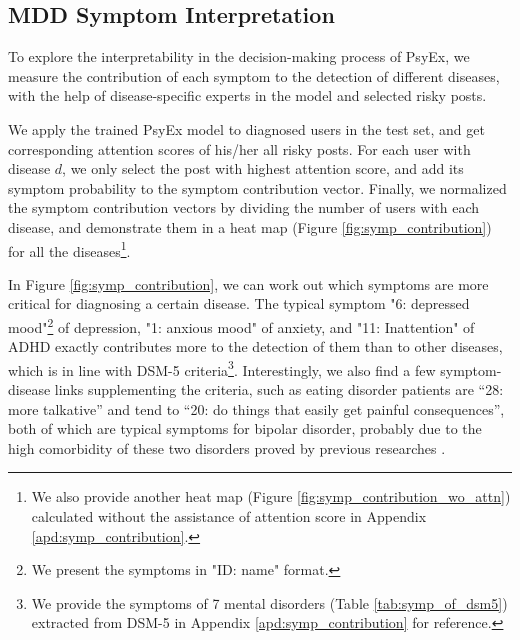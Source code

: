 
\subsection{MDD Symptom Interpretation}
\label{sec:interpret}

To explore the interpretability in the decision-making process of PsyEx, we measure the contribution of each symptom to the detection of different diseases, with the help of disease-specific experts in the model and selected risky posts. 

We apply the trained PsyEx model to diagnosed users in the test set, and get corresponding attention scores of his/her all risky posts.
For each user with disease $d$, we only select the post with highest attention score, and add its symptom probability to the symptom contribution vector. 
Finally, we normalized the symptom contribution vectors by dividing the number of users with each disease, and demonstrate them in a heat map (Figure \ref{fig:symp_contribution}) for all the diseases\footnote{We also provide another heat map (Figure \ref{fig:symp_contribution_wo_attn}) calculated without the assistance of attention score in Appendix \ref{apd:symp_contribution}.}.

In Figure \ref{fig:symp_contribution}, we can work out which symptoms are more critical for diagnosing a certain disease. The typical symptom "6: depressed mood"\footnote{We present the symptoms in "ID: name" format.} of depression, "1: anxious mood" of anxiety, and "11: Inattention" of ADHD exactly contributes more to the detection of them than to other diseases, which is in line with DSM-5 criteria\footnote{We provide the symptoms of 7 mental disorders (Table \ref{tab:symp_of_dsm5}) extracted from DSM-5 in Appendix \ref{apd:symp_contribution} for reference.}. 
Interestingly, we also find a few symptom-disease links supplementing the criteria, such as eating disorder patients are ``28: more talkative'' and tend to ``20: do things that easily get painful consequences'', both of which are typical symptoms for bipolar disorder, probably due to the high comorbidity of these two disorders proved by previous researches \cite{LUNDE2009relation, Ruiz2015Comorbidity}.

